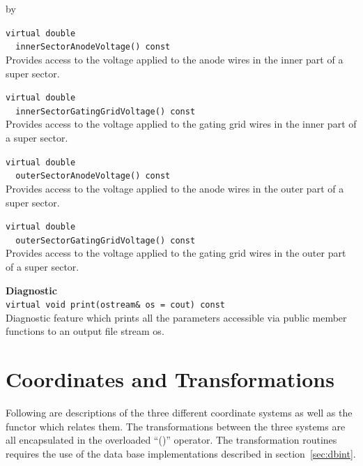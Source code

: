 \documentclass[twoside]{article}
\newcommand{\entrylabel}[1]{\mbox{\textbf{{#1}}}\hfil}%
\newenvironment{entry}
{\begin{list}{}%
    {\renewcommand{\makelabel}{\entrylabel}%
     \setlength{\labelwidth}{90pt}%
     \setlength{\leftmargin}{\labelwidth}
     \advance\leftmargin by \labelsep%
      }%
    }%
  {\end{list}}
\newcommand{\Entrylabel}[1]%
{\raisebox{0pt}[1ex][0pt]{\makebox[\labelwidth][l]%
    {\parbox[t]{\labelwidth}{\hspace{0pt}\textbf{{#1}}}}}}
\newenvironment{Entry}%
{\renewcommand{\entrylabel}{\Entrylabel}\begin{entry}}%
  {\end{entry}}
\begin{document}
\begin{Entry}
  \verb+virtual double+\\
  \verb+  innerSectorAnodeVoltage() const+\\
  Provides access to the voltage applied to the anode wires in the
  inner part of a super sector.

  \verb+virtual double+\\
  \verb+  innerSectorGatingGridVoltage() const+\\
  Provides access to the voltage applied to the gating grid wires
  in the inner part of a super sector.

  \verb+virtual double+\\
  \verb+  outerSectorAnodeVoltage() const+\\
  Provides access to the voltage applied to the anode wires in the
  outer part of a super sector.

  \verb+virtual double+\\
  \verb+  outerSectorGatingGridVoltage() const+\\
  Provides access to the voltage applied to the gating grid wires
  in the outer part of a super sector.

  {\bf Diagnostic \\}
  \verb+virtual void print(ostream& os = cout) const+\\
  Diagnostic feature which prints all the parameters accessible
  via public member functions to an output file stream os.

\end{Entry}
\clearpage

\section{Coordinates and Transformations}
\label{sec:coordtrans}

Following are descriptions of the three different coordinate systems
as well as the functor which relates them.  The transformations between
the three systems are all encapsulated in the overloaded ``()'' operator.
The transformation routines
requires the use of the data base implementations described in
section~\ref{sec:dbint}.
\end{document}

